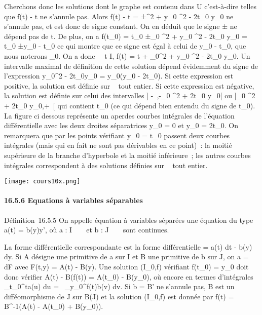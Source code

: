 \documentclass[]{article}
\begin{document}
Cherchons donc les solutions dont le graphe est contenu dans U
c'est-à-dire telles que f(t) - t ne s'annule pas. Alors f(t) - t =
±\sqrtt^2  + y\_0 ^2  -
2t\_0  y\_0 ne s'annule pas, et est donc de signe
constant. On en déduit que le signe ± ne dépend pas de t. De plus, on a
f(t\_0) = t\_0 ±\sqrtt\_0
^2  + y\_0 ^2  - 2t\_0  y\_0 =
t\_0 ±\textbar{}y\_0 - t\_0\textbar{} ce qui
montre que ce signe est égal à celui de y\_0 - t\_0, que
nous noterons \epsilon\_0. On a donc \forall~~t \in I,
f(t) = t + \epsilon\_0\sqrtt^2  +
y\_0 ^2  - 2t\_0  y\_0. Un intervalle
maximal de définition de cette solution dépend évidemment du signe de
l'expression y\_0^2 - 2t\_0y\_0 =
y\_0(y\_0 - 2t\_0). Si cette expression est
positive, la solution est définie sur ~ tout entier. Si cette expression
est négative, la solution est définie sur celui des intervalles {]}
-\infty~,-\sqrtt\_0 ^2  + 2t\_0 
y\_0{[} ou {]}\sqrtt\_0 ^2  +
2t\_0  y\_0,+\infty~{[} qui contient t\_0 (ce qui
dépend bien entendu du signe de t\_0). La figure ci dessous
représente un aper\ccu des courbes intégrales de
l'équation différentielle avec les deux droites séparatrices
y\_0 = 0 et y\_0 = 2t\_0. On remarquera que par
les points vérifiant y\_0 = t\_0 passent deux courbes
intégrales (mais qui en fait ne sont pas dérivables en ce point)~: la
moitié supérieure de la branche d'hyperbole et la moitié inférieure~;
les autres courbes intégrales correspondent à des solutions définies sur
~ tout entier.

\texttt{[image: cours10x.png]}

\paragraph{16.5.6 Equations à variables séparables}

Définition~16.5.5 On appelle équation à variables séparées une équation
du type a(t) = b(y)y', où a : I \rightarrow~ ~ et b : J \rightarrow~ ~ sont continues.

La forme différentielle correspondante est la forme différentielle \omega =
a(t) dt - b(y) dy. Si A désigne une primitive de a sur I et B une
primitive de b sur J, on a \omega = dF avec F(t,y) = A(t) - B(y). Une
solution (I\_0,f) vérifiant f(t\_0) = y\_0 doit
donc vérifier A(t) - B(f(t)) = A(t\_0) - B(y\_0), où
encore en termes d'intégrales \int ~
\_t\_0^ta(u) du =\int ~
\_y\_0^f(t)b(v) dv. Si b = B' ne s'annule pas, B
est un difféomorphisme de J sur B(J) et la solution (I\_0,f) est
donnée par f(t) = B^-1\left (A(t) -
A(t\_0) + B(y\_0)\right ).
\end{document}
